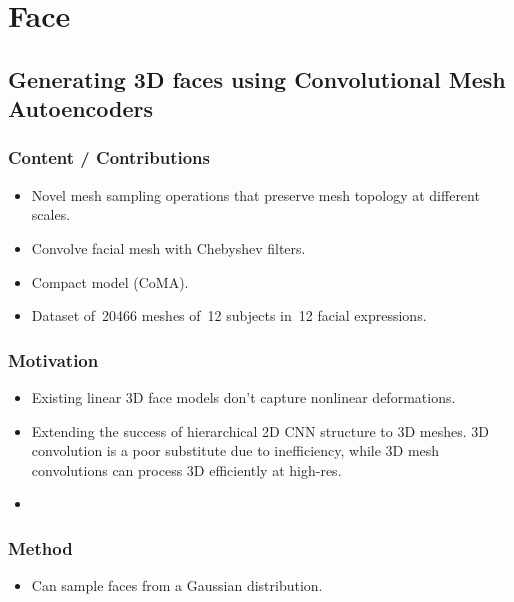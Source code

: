 \documentclass[a4paper, 12pt]{article}
\begin{document}
\section{Face}


\subsection{Generating 3D faces using Convolutional Mesh
            Autoencoders~\cite{ranjan2018generating}}

\subsubsection{Content / Contributions}

\begin{itemize}
\item Novel mesh sampling operations that preserve mesh topology at different
        scales.

\item Convolve facial mesh with Chebyshev filters.

\item Compact model (CoMA).

\item Dataset of~\num{20466} meshes of~\num{12} subjects in~\num{12} facial
        expressions.
\end{itemize}


\subsubsection{Motivation}

\begin{itemize}
\item Existing linear 3D face models don't capture nonlinear deformations.

\item Extending the success of hierarchical 2D CNN structure to 3D meshes.
        3D convolution is a poor substitute due to inefficiency, while 3D
        mesh convolutions can process 3D efficiently at high-res.

\item
\end{itemize}


\subsubsection{Method}

\begin{itemize}
\item Can sample faces from a Gaussian distribution.
\end{itemize}
\end{document}
